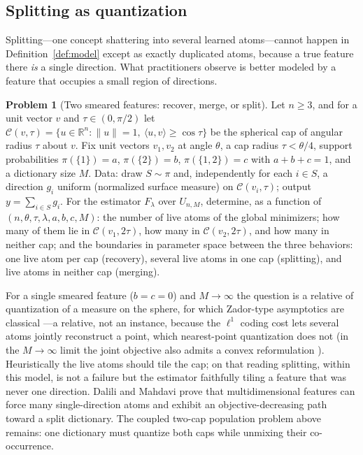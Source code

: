 \documentclass[11pt]{amsart}
\theoremstyle{plain}
\theoremstyle{definition}
\newtheorem{problem}[theorem]{Problem}
\newcommand{\R}{\mathbb{R}}
\begin{document}
\subsection{Splitting as quantization}

Splitting---one concept shattering into several learned atoms---cannot happen in Definition~\ref{def:model} except as exactly duplicated atoms, because a true feature there \emph{is} a single direction. What practitioners observe \cite{bricken2023,chanin2024,leask2025} is better modeled by a feature that occupies a small region of directions.

\begin{problem}[Two smeared features: recover, merge, or split]\label{prob:split}
Let $n\ge3$, and for a unit vector $v$ and $\tau\in(0,\pi/2)$ let $\mathcal C(v,\tau)=\{u\in\R^n:\lVert u\rVert=1,\ \langle u,v\rangle\ge\cos\tau\}$ be the spherical cap of angular radius $\tau$ about $v$. Fix unit vectors $v_1,v_2$ at angle $\theta$, a cap radius $\tau<\theta/4$, support probabilities $\pi(\{1\})=a$, $\pi(\{2\})=b$, $\pi(\{1,2\})=c$ with $a+b+c=1$, and a dictionary size $M$. Data: draw $S\sim\pi$ and, independently for each $i\in S$, a direction $g_i$ uniform (normalized surface measure) on $\mathcal C(v_i,\tau)$; output $y=\sum_{i\in S}g_i$. For the estimator $F_\lambda$ over $U_{n,M}$, determine, as a function of $(n,\theta,\tau,\lambda,a,b,c,M)$: the number of live atoms of the global minimizers; how many of them lie in $\mathcal C(v_1,2\tau)$, how many in $\mathcal C(v_2,2\tau)$, and how many in neither cap; and the boundaries in parameter space between the three behaviors: one live atom per cap (recovery), several live atoms in one cap (splitting), and live atoms in neither cap (merging).
\end{problem}

For a single smeared feature ($b=c=0$) and $M\to\infty$ the question is a relative of quantization of a measure on the sphere, for which Zador-type asymptotics are classical \cite{grafluschgy2000}---a relative, not an instance, because the $\ell^1$ coding cost lets several atoms jointly reconstruct a point, which nearest-point quantization does not (in the $M\to\infty$ limit the joint objective also admits a convex reformulation \cite{bach2008}). Heuristically the live atoms should tile the cap; on that reading splitting, within this model, is not a failure but the estimator faithfully tiling a feature that was never one direction. Dalili and Mahdavi \cite{dalili2026} prove that multidimensional features can force many single-direction atoms and exhibit an objective-decreasing path toward a split dictionary. The coupled two-cap population problem above remains: one dictionary must quantize both caps while unmixing their co-occurrence.
\end{document}
